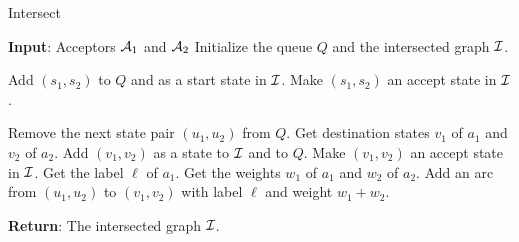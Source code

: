 \begin{algorithm}[t]
\caption{Intersect}
\label{alg:intersect}
\begin{algorithmic}[1]
\STATE \textbf{Input}: Acceptors $\mathcal{A}_1$ and $\mathcal{A}_2$
\STATE Initialize the queue $Q$ and the intersected graph $\mathcal{I}$.

    \STATE Add $(s_1, s_2)$ to $Q$ and as a start state in $\mathcal{I}$.
        \STATE Make $(s_1, s_2)$ an accept state in $\mathcal{I}$.
    \ENDIF
\ENDFOR

    \STATE Remove the next state pair $(u_1, u_2)$ from $Q$.
        \STATE Get destination states $v_1$ of $a_1$ and $v_2$ of $a_2$.
            \STATE Add $(v_1, v_2)$ as a state to $\mathcal{I}$ and to $Q$.
                \STATE Make $(v_1, v_2)$ an accept state in $\mathcal{I}$.
            \ENDIF
        \ENDIF
        \STATE Get the label $\ell$ of $a_1$.
        \STATE Get the weights $w_1$ of $a_1$ and $w_2$ of $a_2$.
        \STATE Add an arc from $(u_1, u_2)$ to $(v_1, v_2)$ with label $\ell$
        and weight $w_1 + w_2$.

    \ENDFOR
\ENDWHILE
\STATE \textbf{Return}: The intersected graph $\mathcal{I}$.
\end{algorithmic}
\end{algorithm}
